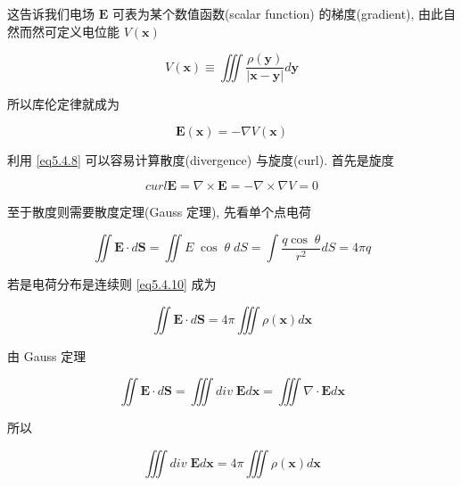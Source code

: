 \documentclass[11pt]{article}
\begin{document}
这告诉我们电场 $ \boldsymbol{E} $ 可表为某个数值函数(scalar function) 的梯度(gradient), 由此自然而然可定义电位能 $ V(\boldsymbol{x}) $

\begin{equation}
V\left( \boldsymbol{x} \right) \equiv \iiint {\frac{{\rho \left( \boldsymbol{y} \right)}}{{\left| {\boldsymbol{x} - \boldsymbol{y}} \right|}}d\boldsymbol{y}}
\label{eq5.4.7}
\end{equation}

所以库伦定律就成为

\begin{equation}
\boldsymbol{E}\left( \boldsymbol{x} \right) =  - \nabla V\left( \boldsymbol{x} \right)
\label{eq5.4.8}
\end{equation}

利用 \ref{eq5.4.8} 可以容易计算散度(divergence) 与旋度(curl). 首先是旋度

\begin{equation}
curl \boldsymbol{E} = \nabla \times \boldsymbol{E} = - \nabla \times \nabla V =0
\label{eq5.4.9}
\end{equation}

至于散度则需要散度定理(Gauss 定理), 先看单个点电荷

\begin{equation}
\iint {\boldsymbol{E} \cdot d\boldsymbol{S}} = \iint {E\;\cos \;\theta \;dS} = \int {\frac{{q\cos \;\theta }}{{{r^2}}}dS}  = 4\pi q
\label{eq5.4.10}
\end{equation}

若是电荷分布是连续则 \ref{eq5.4.10} 成为

\begin{equation}
\iint {\boldsymbol{E} \cdot d\boldsymbol{S}} = 4\pi \iiint {\rho \left( \boldsymbol{x} \right)d\boldsymbol{x}}
\label{eq5.4.11}
\end{equation}

由 Gauss 定理

\begin{equation}
\iint {\boldsymbol{E} \cdot d\boldsymbol{S}} = \iiint {div\;\boldsymbol{E}d\boldsymbol{x}} = \iiint {\nabla  \cdot \boldsymbol{E}d\boldsymbol{x}}
\label{eq5.4.12}
\end{equation}

所以

\begin{equation}
\iiint {div\;\boldsymbol{E}d\boldsymbol{x}} = 4\pi \iiint {\rho \left( \boldsymbol{x} \right)d\boldsymbol{x}}
\label{eq5.4.13}
\end{equation}
\end{document}
